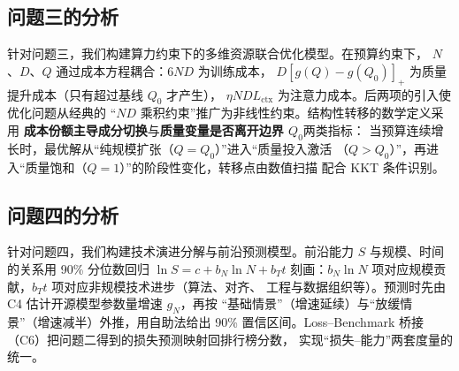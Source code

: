 \subsection{问题三的分析}

针对问题三，我们构建算力约束下的多维资源联合优化模型。在预算约束下，
$N$、$D$、$Q$ 通过成本方程耦合：$6ND$ 为训练成本，
$D[g(Q)-g(Q_0)]_+$ 为质量提升成本（只有超过基线 $Q_0$ 才产生），
$\eta N D L_{\text{ctx}}$ 为注意力成本。后两项的引入使优化问题从经典的
``$ND$ 乘积约束''推广为非线性约束。结构性转移的数学定义采用
\textbf{成本份额主导成分切换}与\textbf{质量变量是否离开边界 $Q_0$}两类指标：
当预算连续增长时，最优解从``纯规模扩张（$Q=Q_0$）''进入``质量投入激活
（$Q>Q_0$）''，再进入``质量饱和（$Q=1$）''的阶段性变化，转移点由数值扫描
配合 KKT 条件识别。

\subsection{问题四的分析}

针对问题四，我们构建技术演进分解与前沿预测模型。前沿能力
$S$ 与规模、时间的关系用 90\% 分位数回归 $\ln S=c+b_N\ln N+b_T t$
刻画：$b_N\ln N$ 项对应规模贡献，$b_T t$ 项对应非规模技术进步（算法、对齐、
工程与数据组织等）。预测时先由 C4 估计开源模型参数量增速 $g_N$，再按
``基础情景''（增速延续）与``放缓情景''（增速减半）外推，用自助法给出 90\%
置信区间。Loss--Benchmark 桥接（C6）把问题二得到的损失预测映射回排行榜分数，
实现``损失--能力''两套度量的统一。
